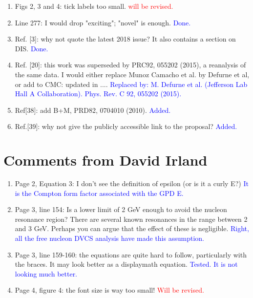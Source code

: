 \documentclass[a4paper,11pt,twoside]{article}
\begin{document}
\begin{enumerate}
   \item Figs 2, 3 and 4: tick labels too small.
\textcolor{red}{will be revised.}

   \item Line 277: I would drop "exciting"; "novel" is enough.
\textcolor{blue}{Done.}

   \item Ref. [3]: why not quote the latest 2018 issue? It also contains a 
      section on DIS.
\textcolor{blue}{Done.}

   \item Ref. [20]: this work was superseded by PRC92, 055202 (2015), a 
      reanalysis of the same data. I would either replace Munoz Camacho et al.  
      by Defurne et al, or add to CMC: updated in ....
      \textcolor{blue}{Replaced by: M. Defurne et al. (Jefferson Lab Hall A 
      Collaboration). Phys. Rev. C 92, 055202 (2015).}

   \item Ref[38]: add B+M, PRD82, 0704010 (2010).
\textcolor{blue}{Added.}

   \item Ref.[39]: why not give the publicly accessible link to the proposal?
   \textcolor{blue}{Added.}
  
\end{enumerate}



\section{Comments from David Irland}


\begin{enumerate}

\item Page 2, Equation 3: I don't see the definition of epsilon (or is it a 
   curly E?)
\textcolor{blue}{It is the Compton form factor associated with the GPD E.}

\item Page 3, line 154: Is a lower limit of 2 GeV enough to avoid the nucleon 
   resonance region? There are several known resonances in the range between 2 
      and 3 GeV. Perhaps you can argue that the effect of these is negligible.
\textcolor{blue}{Right, all the free nucleon DVCS analysis have made this 
      assumption.}

\item Page 3, line 159-160: the equations are quite hard to follow, 
   particularly with the braces. It may look better as a displaymath equation.
\textcolor{blue}{Tested. It is not looking much better.}

\item Page 4, figure 4: the font size is way too small!  \textcolor{red}{Will 
   be revised.}
  
\end{enumerate}
\end{document}
